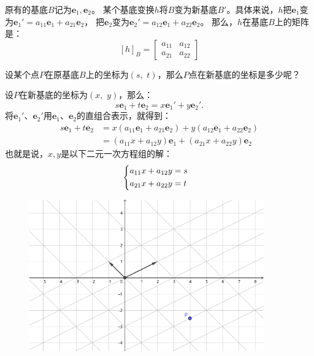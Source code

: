 \documentclass[12pt,UTF8]{ctexbook}
\begin{document}
原有的基底$B$记为$\mathbf{e}_1, \mathbf{e}_2$。
某个基底变换$h$将$B$变为新基底$B'$。具体来说，$h$把$\mathbf{e}_1$变为$\mathbf{e}_1' = a_{11}\mathbf{e}_1 + a_{21}\mathbf{e}_2$，
把$\mathbf{e}_2$变为$\mathbf{e}_2' = a_{12}\mathbf{e}_1 + a_{22}\mathbf{e}_2$。
那么，$h$在基底$B$上的矩阵是：
$$
\left[h\right]_{B} = 
\begin{bmatrix}
    a_{11} & a_{12} \\ a_{21} & a_{22}
\end{bmatrix}
$$

设某个点$P$在原基底$B$上的坐标为$(s,\,\, t)$，那么$P$点在新基底的坐标是多少呢？

设$P$在新基底的坐标为$(x,\,\, y)$，那么：
$$ s\mathbf{e}_1 + t\mathbf{e}_2 = x\mathbf{e}_1' + y\mathbf{e}_2'.$$
将$\mathbf{e}_1'$、$\mathbf{e}_2'$用$\mathbf{e}_1$、$\mathbf{e}_2$的直组合表示，就得到：
\begin{align*}
    s\mathbf{e}_1 + t\mathbf{e}_2 &= x(a_{11}\mathbf{e}_1 + a_{21}\mathbf{e}_2) + y(a_{12}\mathbf{e}_1 + a_{22}\mathbf{e}_2)  \\
    &= (a_{11}x + a_{12}y)\mathbf{e}_1 + (a_{21}x + a_{22}y)\mathbf{e}_2 
\end{align*}
也就是说，$x, y$是以下二元一次方程组的解：
\begin{alignat*}{1}
    &   \begin{dcases}
            a_{11}x + a_{12}y = s \\
            a_{21}x + a_{22}y = t
        \end{dcases}
\end{alignat*}

\begin{figure}[h]
    \vspace{4pt}
    \centering
    \includegraphics[width=0.9\textwidth]{tu/基变换1.png}
    \captionsetup{justification=centering}
\end{figure}
\end{document}
